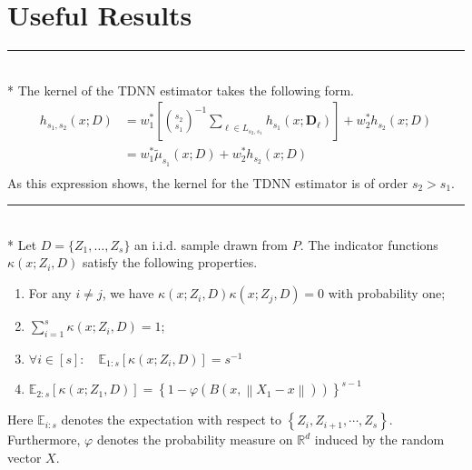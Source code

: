 \section{Useful Results}
\hrule

\begin{lem}\label{lem:dem8}\mbox{}\\*
	The kernel of the TDNN estimator takes the following form.
	\begin{equation}
		\begin{aligned}
			h_{s_1, s_2}\left(x; D\right)
			 & = w_{1}^{*}\left[\binom{s_2}{s_1}^{-1}\sum_{\ell \in L_{s_2, s_1}} h_{s_1}\left(x; \mathbf{D}_{\ell}\right)\right] + w_{2}^{*} h_{s_2}\left(x; D\right) \\
			 & = w_{1}^{*} \tilde{\mu}_{s_1}\left(x; D\right) + w_{2}^{*} h_{s_2}\left(x; D\right)                                                                     \\
		\end{aligned}
	\end{equation}
	As this expression shows, the kernel for the TDNN estimator is of order $s_2 > s_1$.
\end{lem}
\hrule

\begin{lem}\label{lem:dem12}\mbox{}\\*
	Let $D = \{Z_1, \dotsc, Z_s\}$ an i.i.d. sample drawn from $P$.
	The indicator functions $\kappa\left(x; Z_{i}, D\right)$ satisfy the following properties.
	\begin{enumerate}
		\item For any $i \neq j$, we have $\kappa\left(x; Z_{i}, D\right) \kappa\left(x; Z_{j}, D\right)=0$ with probability one;
		\item $\sum_{i=1}^{s} \kappa\left(x; Z_{i}, D\right)=1$;
		\item $\forall i \in [s]: \quad \mathbb{E}_{1:s}\left[\kappa\left(x; Z_{i}, D\right)\right]=s^{-1}$
		\item $\mathbb{E}_{2: s}\left[\kappa\left(x; Z_1, D\right)\right]=\left\{1-\varphi\left(B\left(x,\left\|X_1-x\right\|\right)\right)\right\}^{s-1}$
	\end{enumerate}
	Here $\mathbb{E}_{i: s}$ denotes the expectation with respect to $\left\{Z_{i}, Z_{i+1}, \cdots, Z_s\right\}$.
	Furthermore, $\varphi$ denotes the probability measure on $\mathbb{R}^{d}$ induced by the random vector $X$.
\end{lem}

